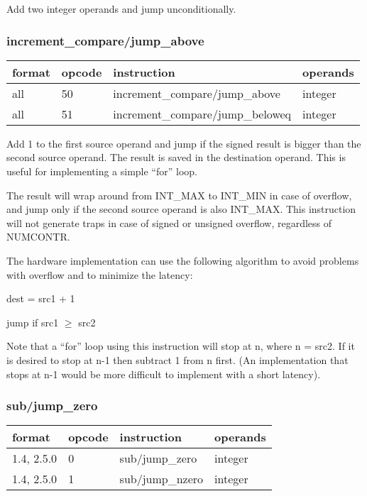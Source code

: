 \documentclass[forwardcom.tex]{subfiles}
\begin{document}
Add two integer operands and jump unconditionally.

\subsubsection{increment\_compare/jump\_above}
\label{table:addJumpInstruction}
\begin{tabular}{|p{16mm}|p{12mm}|p{60mm}|p{50mm}|}
\hline
\bfseries format & \bfseries opcode & \bfseries instruction & \bfseries operands \\ \hline
all & 50 & increment\_compare/jump\_above & integer \\ \hline
all & 51 & increment\_compare/jump\_beloweq & integer \\ \hline
\end{tabular}
\vspace{2mm}

Add 1 to the first source operand and jump if the signed result is bigger than the second source operand. The result is saved in the destination operand. This is useful for implementing a simple ``for'' loop.
\vspace{2mm}

The result will wrap around from INT\_MAX to INT\_MIN in case of overflow, and jump only if the second source operand is also INT\_MAX. This instruction will not generate traps in case of signed or unsigned overflow, regardless of NUMCONTR.
\vspace{2mm}

\vspace{2mm}

The hardware implementation can use the following algorithm to avoid problems with overflow and to minimize the latency:

dest = src1 + 1

jump if src1 $\geq$ src2
\vspace{2mm}

Note that a ``for'' loop using this instruction will stop at n, where n = src2. If it is desired to stop at n-1 then subtract 1 from n first. (An implementation that stops at n-1 would be more difficult to implement with a short latency).

\subsubsection{sub/jump\_zero}
\label{table:subJumpZeroInstruction}
\begin{tabular}{|p{16mm}|p{12mm}|p{60mm}|p{50mm}|}
\hline
\bfseries format & \bfseries opcode & \bfseries instruction & \bfseries operands \\ \hline
1.4, 2.5.0 &  0 & sub/jump\_zero & integer \\ \hline
1.4, 2.5.0 &  1 & sub/jump\_nzero  & integer\\ \hline
\end{tabular}
\vspace{2mm}
\end{document}
